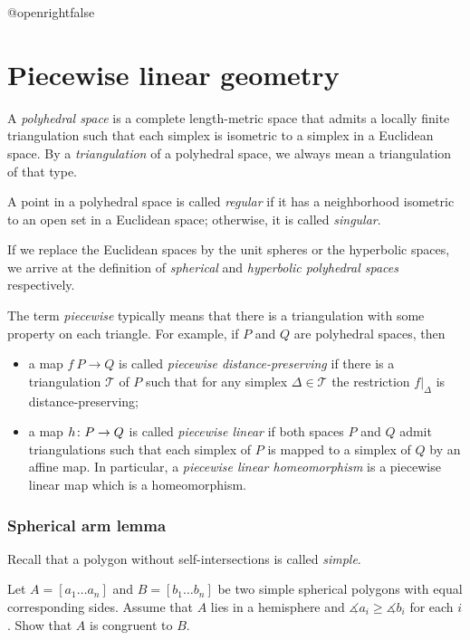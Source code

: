 \csname @openrightfalse\endcsname
\chapter{Piecewise linear geometry}


A \emph{polyhedral space} is a complete length-metric space that admits a locally finite triangulation 
such that each simplex is isometric to a simplex in a Euclidean space.
By a {}\emph{triangulation} of a polyhedral space, we always mean a triangulation of that type. 

A point in a polyhedral space is called \emph{regular} if it has a neighborhood isometric to an open set in a Euclidean space;
otherwise, it is called {}\emph{singular}.

If we replace the Euclidean spaces by the unit spheres or the hyperbolic spaces,
we arrive at the definition of {}\emph{spherical} and {}\emph{hyperbolic polyhedral spaces} respectively.

The term \emph{piecewise} typically means that there is a triangulation with some property on each triangle.
For example,  if $P$ and $Q$ are polyhedral spaces, then
\begin{itemize}
\item a map $f\:P\to Q$ is called {}\emph{piecewise distance-preserving} if there is a triangulation $\mathcal{T}$ of $P$ such that for any simplex $\Delta\in \mathcal{T}$ the restriction $f|_\Delta$ is distance-preserving;
\item a map $h\:P\z\to Q$  is called {}\emph{piecewise linear} if both spaces $P$ and $Q$ admit triangulations such that each simplex of $P$ is mapped to a simplex of $Q$ by an affine map.
In particular, a {}\emph{piecewise linear homeomorphism} is a piecewise linear map which is a homeomorphism.\label{piecewise linear map}
\end{itemize}





\subsection*{Spherical arm lemma}\label{Spherical arm lemma}

Recall that a polygon without self-intersections is called \emph{simple}.

\begin{pr}
Let $A=[a_1\dots a_n]$ and $B=[b_1\dots b_n]$ be two simple spherical polygons 
with equal corresponding sides.
Assume that $A$ lies in a hemisphere and $\measuredangle a_i\ge\measuredangle b_i$ for each $i$.
Show that $A$ is congruent to $B$.
\end{pr}

